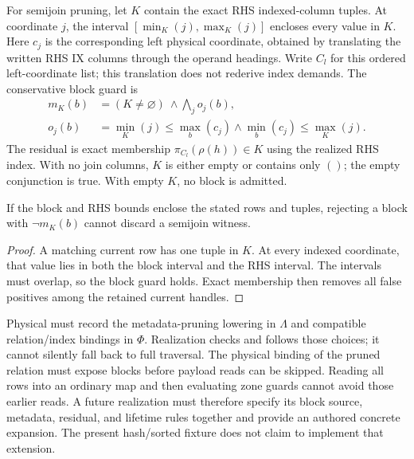 For semijoin pruning, let $K$ contain the exact RHS indexed-column tuples.
At coordinate $j$, the interval $[\min_K(j),\max_K(j)]$ encloses every value in $K$.
Here $c_j$ is the corresponding left physical coordinate, obtained by translating
the written RHS IX columns through the operand headings. Write $C_l$ for this
ordered left-coordinate list; this translation does not rederive index demands.
The conservative block guard is
\[
\begin{aligned}
 m_K(b)&=(K\ne\varnothing)\ \land\bigwedge_j o_j(b),\\
 o_j(b)&=\min_K(j)\le\max_b(c_j)
                \land\min_b(c_j)\le\max_K(j).
\end{aligned}
\]
The residual is exact membership $\pi_{C_l}(\rho(h))\in K$ using the realized RHS
index. With no join columns, $K$ is either empty or contains only $()$; the
empty conjunction is true. With empty $K$, no block is admitted.

\begin{lemma}
If the block and RHS bounds enclose the stated rows and tuples, rejecting a block
with $\neg m_K(b)$ cannot discard a semijoin witness.
\end{lemma}
\begin{proof}
A matching current row has one tuple in $K$. At every indexed coordinate, that
value lies in both the block interval and the RHS interval. The intervals must
overlap, so the block guard holds. Exact membership then removes all false
positives among the retained current handles.
\end{proof}

Physical must record the metadata-pruning lowering in $\Lambda$ and compatible
relation/index bindings in $\Phi$. Realization checks and follows those choices;
it cannot silently fall back to full traversal. The physical binding of the
pruned relation must expose blocks before payload reads
can be skipped. Reading all rows into an ordinary map and then evaluating zone
guards cannot avoid those earlier reads. A future realization must therefore
specify its block source, metadata, residual, and lifetime rules together and
provide an authored concrete expansion. The present hash/sorted fixture does
not claim to implement that extension.
